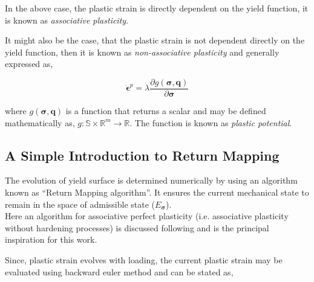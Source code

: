  In the above case, the plastic strain is directly dependent on the yield function, it is known as \textit{associative plasticity}.
 
 It might also be the case, that the plastic strain is not dependent directly on the yield function, then it is known as \textit{non-associative plasticity} and generally expressed as,
 
 \begin{equation}
 \dot {\bm \epsilon}^p = \dot{\lambda} \frac{\partial g(\bm \sigma, \bm q)}{\partial{\bm \sigma}}
 \end{equation}
 
 where $g(\bm \sigma, \bm q)$ is a function that returns a scalar and may be defined mathematically as, $g:\mathbb{S} \times \mathbb{R}^m \rightarrow \mathbb{R}$. The function is known as \textit{plastic potential}. \cite{borja}
 
 \subsection*{A Simple Introduction to Return Mapping}
 
 The evolution of yield surface is determined numerically by using an algorithm known as ``Return Mapping algorithm''\cite{simo}. It ensures the current mechanical state to remain in the space of admissible state ($E_{\bm \sigma}$).\\
 Here an algorithm for associative perfect plasticity (i.e. associative plasticity without hardening processes) is discussed following\cite{simo} and is the principal inspiration for this work.
 
 Since, plastic strain evolves with loading, the current plastic strain may be evaluated using backward euler method and can be stated as,
 
